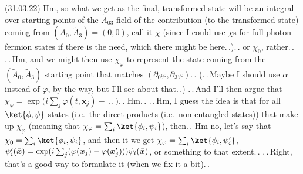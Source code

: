 \documentclass{report}
\begin{document}

(31.03.22) Hm, so what we get as the final, transformed state will be an integral over starting points of the $\tilde A_{03}$ field of the contribution (to the transformed state) coming from $(\tilde A_0, \tilde A_3)=(0,0)$, call it $\chi$ (since I could use $\chi$s for full photon-fermion states if there is the need, which there might be here.\,.).\,. or $\chi_0$, rather.\,. .\,.\,Hm, and we might then use $\chi_\varphi$ to represent the state coming from the $(\tilde A_0, \tilde A_3)$ starting point that matches $(\partial_0 \varphi, \partial_3 \varphi)$.\,. (.\,.\,Maybe I should use $\alpha$ instead of $\varphi$, by the way, but I'll see about that.\,.) .\,.\,And I'll then argue that $\chi_\varphi = \exp\big(i\sum_j\varphi(t, \boldsymbol{x}_j) - \,.\,.\, \big)$.\,. Hm.\,. .\,.\,Hm, I guess the idea is that for all $\ket{\phi, \psi}$-states (i.e.\ the direct products (i.e.\ non-entangled states)) that make up $\chi_\varphi$ (meaning that $\chi_\varphi = \sum_i \ket{\phi_i, \psi_i}$), then.\,. Hm no, let's say that $\chi_0 = \sum_i \ket{\phi_i, \psi_i}$, and then it we get $\chi_\varphi = \sum_i \ket{\phi_i, \psi_i'}$, 
$\psi'_i(\bar{\boldsymbol{x}\hspace{.05em}}\hspace{-.05em}) = \exp(i\sum_j(\varphi(\boldsymbol{x}_j) - \varphi(\boldsymbol{x}'_j)))\psi_i(\bar{\boldsymbol{x}\hspace{.05em}}\hspace{-.05em})$, or something to that extent.\,. .\,.\,Right, that's a good way to formulate it (when we fix it a bit).\,. 
\end{document}
